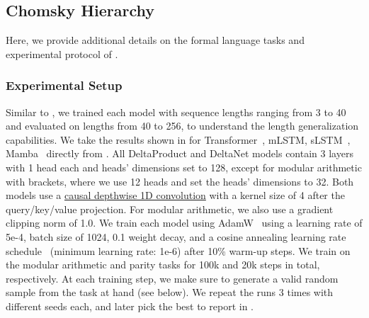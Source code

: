 \documentclass{article} %
\begin{document}
\subsection{Chomsky Hierarchy}\label{app:chomsky}

Here, we provide additional details on the formal language tasks and experimental protocol of .


\subsubsection{Experimental Setup}

Similar to \citet{beck-neurips24a}, we trained each model with sequence lengths ranging from 3 to 40 and evaluated on lengths from 40 to 256, to understand the length generalization capabilities. We take the results shown in  for Transformer~\citep{vaswani-neurips17a}, mLSTM, sLSTM~\citep{beck-neurips24a}, Mamba~\citep{gu-arxiv23a} directly from \citet{grazzi-iclr25a}.
All DeltaProduct and DeltaNet models contain 3 layers with 1 head each and heads' dimensions set to 128, except for modular arithmetic with brackets, where we use 12 heads and set the heads' dimensions to 32. Both models use a \href{https://github.com/Dao-AILab/causal-conv1d}{causal depthwise 1D convolution} with a kernel size of 4 after the query/key/value projection. For modular arithmetic, we also use a gradient clipping norm of 1.0. We train each model using AdamW~\citep{loshchilov-iclr19a} using a learning rate of 5e-4, batch size of 1024, 0.1 weight decay, and a cosine annealing learning rate schedule~\citep{loshchilov-iclr17a} (minimum learning rate: 1e-6) after 10\% warm-up steps. We train on the modular arithmetic and parity tasks for 100k and 20k steps in total, respectively. At each training step, we make sure to generate a valid random sample from the task at hand (see below). We repeat the runs 3 times with different seeds each, and later pick the best to report in .
\end{document}
